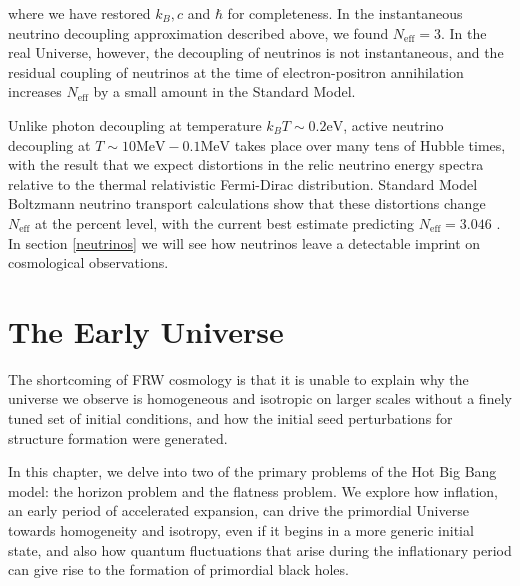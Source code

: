 where we have restored $k_{B}, c$ and $\hbar$ for completeness. In the instantaneous neutrino decoupling approximation described above, we found $N_{\text{eff}}=3$. In the real Universe, however, the decoupling of neutrinos is not instantaneous, and the residual coupling of neutrinos at the time of electron-positron annihilation increases $N_{\text{eff}}$ by a small amount in the Standard Model.

Unlike photon decoupling at temperature $k_{B} T \sim 0.2 \mathrm{eV}$, active neutrino decoupling at $T \sim 10 \mathrm{MeV}-0.1 \mathrm{MeV}$ takes place over many tens of Hubble times, with the result that we expect distortions in the relic neutrino energy spectra relative to the thermal relativistic Fermi-Dirac distribution. Standard Model Boltzmann neutrino transport calculations show that these distortions change $N_{\text{eff}}$ at the percent level, with the current best estimate predicting $N_{\text{eff}}=3.046$ \cite{Mangano_2005}. In section \ref{neutrinos} we will see how neutrinos leave a detectable imprint on cosmological observations.







\section{The Early Universe}
\hspace{0.5cm} The shortcoming of FRW cosmology is that it is unable to explain why the universe we observe is homogeneous and isotropic on larger scales without a finely tuned set of initial conditions, and how the initial seed perturbations for structure formation were generated.

In this chapter, we delve into two of the primary problems of the Hot Big Bang model: the horizon problem and the flatness problem. We explore how inflation, an early period of accelerated expansion, can drive the primordial Universe towards homogeneity and isotropy, even if it begins in a more generic initial state, and also how quantum fluctuations that arise during the inflationary period can give rise to the formation of primordial black holes.

